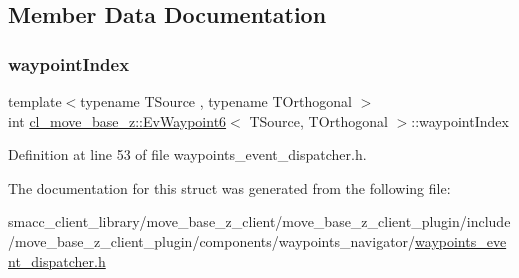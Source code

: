\subsection{Member Data Documentation}
\mbox{\label{structcl__move__base__z_1_1EvWaypoint6_a29e179077498573199cc66c680666cf2}} 
\subsubsection{\texorpdfstring{waypoint\+Index}{waypointIndex}}
{\footnotesize\ttfamily template$<$typename T\+Source , typename T\+Orthogonal $>$ \\
int \hyperlink{structcl__move__base__z_1_1EvWaypoint6}{cl\+\_\+move\+\_\+base\+\_\+z\+::\+Ev\+Waypoint6}$<$ T\+Source, T\+Orthogonal $>$\+::waypoint\+Index}



Definition at line 53 of file waypoints\+\_\+event\+\_\+dispatcher.\+h.



The documentation for this struct was generated from the following file\+:\begin{DoxyCompactItemize}
\item 
smacc\+\_\+client\+\_\+library/move\+\_\+base\+\_\+z\+\_\+client/move\+\_\+base\+\_\+z\+\_\+client\+\_\+plugin/include/move\+\_\+base\+\_\+z\+\_\+client\+\_\+plugin/components/waypoints\+\_\+navigator/\hyperlink{waypoints__event__dispatcher_8h}{waypoints\+\_\+event\+\_\+dispatcher.\+h}\end{DoxyCompactItemize}
